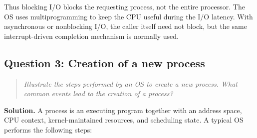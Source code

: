 Thus blocking I/O blocks the requesting process, not the entire processor.
The OS uses multiprogramming to keep the CPU useful during the I/O latency.
With asynchronous or nonblocking I/O, the caller itself need not block, but
the same interrupt-driven completion mechanism is normally used.

\subsection{Question 3: Creation of a new process}
\begin{quote}
\itshape
Illustrate the steps performed by an OS to create a new process.  What common
events lead to the creation of a process?
\end{quote}

\textbf{Solution.}
A process is an executing program together with an address space, CPU
context, kernel-maintained resources, and scheduling state.  A typical OS
performs the following steps:

